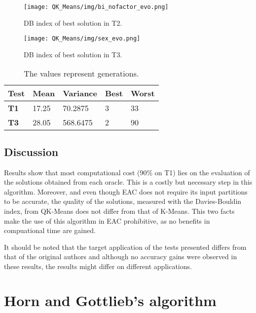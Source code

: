 \begin{figure}[hbtp]
\centering
\texttt{[image: QK\_Means/img/bi\_nofactor\_evo.png]}
\caption{DB index of best solution in T2.}
\label{fig:qk_db_index_best_evo_t2}
\end{figure}


\begin{figure}[hbtp]
\centering
\texttt{[image: QK\_Means/img/sex\_evo.png]}
\caption{DB index of best solution in T3.}
\label{fig:qk_db_index_best_evo_t3}
\end{figure}


\begin{table}[h]
\caption{The values represent generations.}
\begin{tabular}{|l|l|l|l|l|}
\hline
\textbf{Test} & \textbf{Mean} & \textbf{Variance} & \textbf{Best} & \textbf{Worst} \\ \hline
\textbf{T1}   & 17.25         & 70.2875           & 3             & 33             \\ \hline
\textbf{T3}   & 28.05         & 568.6475          & 2             & 90             \\ \hline
\end{tabular}
\label{tab:db_index_t1_t3}
\end{table}

\subsection{Discussion}

Results show that most computational cost (90\% on T1) lies on the evaluation of the solutions obtained from each oracle. This is a costly but necessary step in this algorithm. Moreover, and even though EAC does not require its input partitions to be accurate, the quality of the solutions, measured with the Davies-Bouldin index, from QK-Means does not differ from that of K-Means. This two facts make the use of this algorithm in EAC prohibitive, as no benefits in compuational time are gained.

It should be noted that the target application of the tests presented differs from that of the original authors and although no accuracy gains were observed in these results, the results might differ on different applications.

\section{Horn and Gottlieb's algorithm}


